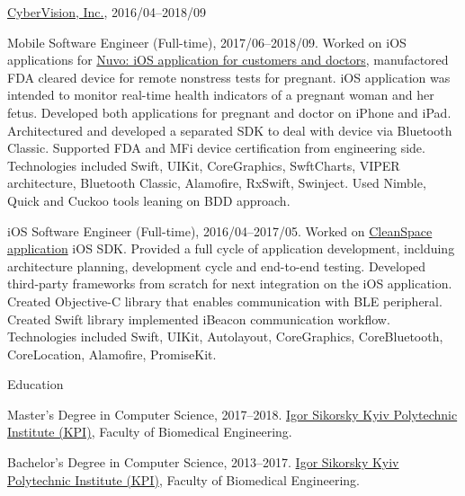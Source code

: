 \documentclass{article}
\begin{document}
\href{https://www.cybervisiontech.com}{CyberVision, Inc.}, 2016/04–2018/09

Mobile Software Engineer (Full-time), 2017/06–2018/09.
Worked on iOS applications for \href{https://www.nuvocares.com/solutions}{Nuvo: iOS application for customers and doctors}, manufactored FDA cleared device for remote nonstress tests for pregnant.
iOS application was intended to monitor real-time health indicators of a pregnant woman and her fetus.
Developed both applications for pregnant and doctor on iPhone and iPad.
Architectured and developed a separated SDK to deal with device via Bluetooth Classic.
Supported FDA and MFi device certification from engineering side.
Technologies included Swift, UIKit, CoreGraphics, SwftCharts, VIPER architecture, Bluetooth Classic, Alamofire, RxSwift, Swinject.
Used Nimble, Quick and Cuckoo tools leaning on BDD approach.

iOS Software Engineer (Full-time), 2016/04–2017/05. 
Worked on \href{https://apps.apple.com/us/app/cleanspace-air-pollution-app/id987959047}{CleanSpace application} iOS SDK. 
Provided a full cycle of application development, inclduing architecture planning, development cycle and end-to-end testing.
Developed third-party frameworks from scratch for next integration on the iOS application.
Created Objective-C library that enables communication with BLE peripheral.
Created Swift library implemented iBeacon communication workflow. 
Technologies included Swift, UIKit, Autolayout, CoreGraphics, CoreBluetooth, CoreLocation, Alamofire, PromiseKit.

Education %

Master's Degree in Computer Science, 2017–2018.
\href{https://kpi.ua/en}{Igor Sikorsky Kyiv Polytechnic Institute (KPI)}, Faculty of Biomedical Engineering.

Bachelor's Degree in Computer Science, 2013–2017.
\href{https://kpi.ua/en}{Igor Sikorsky Kyiv Polytechnic Institute (KPI)}, Faculty of Biomedical Engineering.
\end{document}
